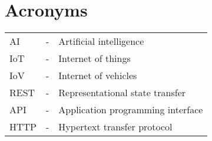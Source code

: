 \chapter{Acronyms}
\begin{center}
	\begin{tabular}{lcl}
	AI & - & Artificial intelligence \\
	IoT & - & Internet of things  \\
	IoV & - & Internet of vehicles\\
	REST & - & Representational state transfer\\
	API & - & Application programming interface\\
	HTTP & - & Hypertext transfer protocol
	\end{tabular}
\end{center}
